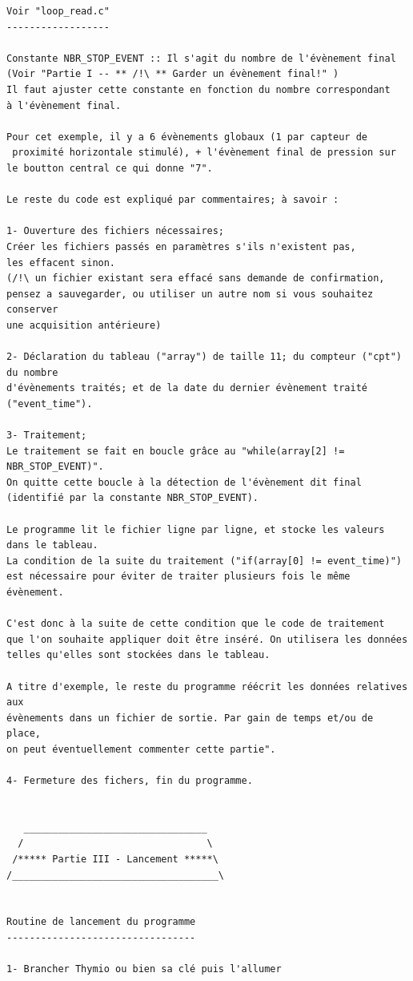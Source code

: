\documentclass[a4paper, 12pt]{report}
\begin{document}
\begin{verbatim}
Voir "loop_read.c"
------------------

Constante NBR_STOP_EVENT :: Il s'agit du nombre de l'évènement final
(Voir "Partie I -- ** /!\ ** Garder un évènement final!" )
Il faut ajuster cette constante en fonction du nombre correspondant 
à l'évènement final.

Pour cet exemple, il y a 6 évènements globaux (1 par capteur de
 proximité horizontale stimulé), + l'évènement final de pression sur 
le boutton central ce qui donne "7".

Le reste du code est expliqué par commentaires; à savoir :

1- Ouverture des fichiers nécessaires;
Créer les fichiers passés en paramètres s'ils n'existent pas, 
les effacent sinon. 
(/!\ un fichier existant sera effacé sans demande de confirmation, 
pensez a sauvegarder, ou utiliser un autre nom si vous souhaitez conserver 
une acquisition antérieure)

2- Déclaration du tableau ("array") de taille 11; du compteur ("cpt") du nombre 
d'évènements traités; et de la date du dernier évènement traité ("event_time").

3- Traitement;
Le traitement se fait en boucle grâce au "while(array[2] != NBR_STOP_EVENT)". 
On quitte cette boucle à la détection de l'évènement dit final 
(identifié par la constante NBR_STOP_EVENT).

Le programme lit le fichier ligne par ligne, et stocke les valeurs 
dans le tableau.
La condition de la suite du traitement ("if(array[0] != event_time)") 
est nécessaire pour éviter de traiter plusieurs fois le même évènement.

C'est donc à la suite de cette condition que le code de traitement 
que l'on souhaite appliquer doit être inséré. On utilisera les données 
telles qu'elles sont stockées dans le tableau.

A titre d'exemple, le reste du programme réécrit les données relatives aux 
évènements dans un fichier de sortie. Par gain de temps et/ou de place, 
on peut éventuellement commenter cette partie".

4- Fermeture des fichers, fin du programme.


   ________________________________
  /                                \
 /***** Partie III - Lancement *****\
/____________________________________\


Routine de lancement du programme
---------------------------------

1- Brancher Thymio ou bien sa clé puis l'allumer


\end{verbatim}
\end{document}
